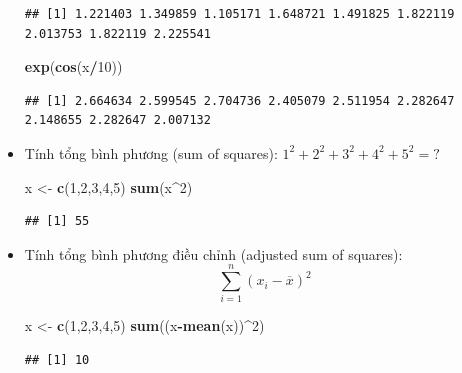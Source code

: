 \documentclass[
]{book}
\newenvironment{Shaded}{\begin{snugshade}}{\end{snugshade}}
\newcommand{\DecValTok}[1]{\textcolor[rgb]{0.00,0.00,0.81}{#1}}
\newcommand{\KeywordTok}[1]{\textcolor[rgb]{0.13,0.29,0.53}{\textbf{#1}}}
\newcommand{\NormalTok}[1]{#1}
\newcommand{\OperatorTok}[1]{\textcolor[rgb]{0.81,0.36,0.00}{\textbf{#1}}}
\newcommand{\StringTok}[1]{\textcolor[rgb]{0.31,0.60,0.02}{#1}}
\begin{document}
\begin{itemize}
\begin{verbatim}
## [1] 1.221403 1.349859 1.105171 1.648721 1.491825 1.822119 2.013753 1.822119 2.225541
\end{verbatim}

\begin{Shaded}
\begin{Highlighting}[]
\KeywordTok{exp}\NormalTok{(}\KeywordTok{cos}\NormalTok{(x}\OperatorTok{/}\DecValTok{10}\NormalTok{))}
\end{Highlighting}
\end{Shaded}

\begin{verbatim}
## [1] 2.664634 2.599545 2.704736 2.405079 2.511954 2.282647 2.148655 2.282647 2.007132
\end{verbatim}
\item
  Tính tổng bình phương (sum of squares): \(1^2 + 2^2 + 3^2 + 4^2 + 5^2 = ?\)

\begin{Shaded}
\begin{Highlighting}[]
\NormalTok{x \textless{}{-}}\StringTok{ }\KeywordTok{c}\NormalTok{(}\DecValTok{1}\NormalTok{,}\DecValTok{2}\NormalTok{,}\DecValTok{3}\NormalTok{,}\DecValTok{4}\NormalTok{,}\DecValTok{5}\NormalTok{)}
\KeywordTok{sum}\NormalTok{(x}\OperatorTok{\^{}}\DecValTok{2}\NormalTok{)}
\end{Highlighting}
\end{Shaded}

\begin{verbatim}
## [1] 55
\end{verbatim}
\item
  Tính tổng bình phương điều chỉnh (adjusted sum of squares):
  \[\sum_{i = 1}^{n}\left( x_{i} - \overline{x} \right)^{2}\]

\begin{Shaded}
\begin{Highlighting}[]
\NormalTok{x \textless{}{-}}\StringTok{ }\KeywordTok{c}\NormalTok{(}\DecValTok{1}\NormalTok{,}\DecValTok{2}\NormalTok{,}\DecValTok{3}\NormalTok{,}\DecValTok{4}\NormalTok{,}\DecValTok{5}\NormalTok{)}
\KeywordTok{sum}\NormalTok{((x}\OperatorTok{{-}}\KeywordTok{mean}\NormalTok{(x))}\OperatorTok{\^{}}\DecValTok{2}\NormalTok{)}
\end{Highlighting}
\end{Shaded}

\begin{verbatim}
## [1] 10
\end{verbatim}


\end{itemize}
\end{document}
